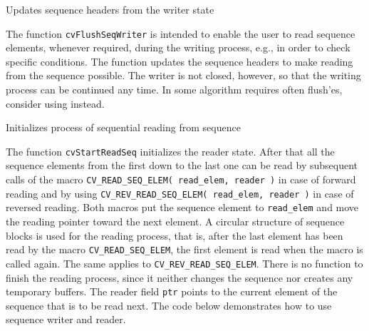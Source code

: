\label{FlushSeqWriter}

Updates sequence headers from the writer state


\begin{description}
\end{description}

The function \texttt{cvFlushSeqWriter} is intended to enable the user to
read sequence elements, whenever required, during the writing process,
e.g., in order to check specific conditions. The function updates the
sequence headers to make reading from the sequence possible. The writer
is not closed, however, so that the writing process can be continued
any time. In some algorithm requires often flush'es, consider using
 instead.

\label{StartReadSeq}

Initializes process of sequential reading from sequence


\begin{description}
\end{description}

The function \texttt{cvStartReadSeq} initializes the reader state. After
that all the sequence elements from the first down to the last one
can be read by subsequent calls of the macro
\texttt{CV\_READ\_SEQ\_ELEM( read\_elem, reader )}
in case of forward reading and by using
\texttt{CV\_REV\_READ\_SEQ\_ELEM( read\_elem, reader )}
in case of reversed
reading. Both macros put the sequence element to \texttt{read\_elem} and
move the reading pointer toward the next element. A circular structure
of sequence blocks is used for the reading process, that is, after the
last element has been read by the macro \texttt{CV\_READ\_SEQ\_ELEM}, the
first element is read when the macro is called again. The same applies to
\texttt{CV\_REV\_READ\_SEQ\_ELEM}. There is no function to finish the reading
process, since it neither changes the sequence nor creates any temporary
buffers. The reader field \texttt{ptr} points to the current element of
the sequence that is to be read next. The code below demonstrates how
to use sequence writer and reader.

